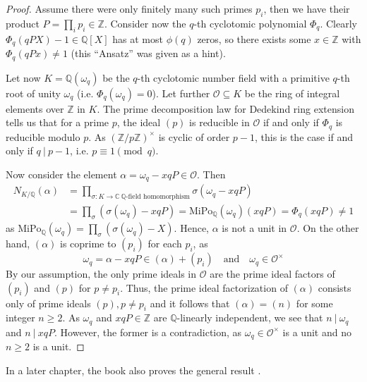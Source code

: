 \documentclass{scrartcl}
\newcommand{\Z}{\mathbb{Z}}
\newcommand{\Q}{\mathbb{Q}}
\newcommand{\C}{\mathbb{C}}
\newcommand{\divides}{\ | \ }
\newcommand{\units}{\times}
\theoremstyle{definition}
\begin{document}
\begin{proof}
    Assume there were only finitely many such primes $p_i$, then we have their product $P = \prod_i p_i \in \Z$.
    Consider now the $q$-th cyclotomic polynomial $\Phi_q$.
    Clearly $\Phi_q(qPX) - 1 \in \Q[X]$ has at most $\phi(q)$ zeros, so there exists some $x \in \Z$ with $\Phi_q(qPx) \neq 1$ (this ``Ansatz'' was given as a hint).

    Let now $K = \Q(\omega_q)$ be the $q$-th cyclotomic number field with a primitive $q$-th root of unity $\omega_q$ (i.e. $\Phi_q(\omega_q) = 0$).
    Let further $\mathcal{O} \subseteq K$ be the ring of integral elements over $\Z$ in $K$.
    The prime decomposition law for Dedekind ring extension \cite[Chapter I, Prop 8.3]{neukirch} tells us that for a prime $p$, the ideal $(p)$ is reducible in $\mathcal{O}$ if and only if $\Phi_q$ is reducible modulo $p$.
    As $(\Z/p\Z)^\units$ is cyclic of order $p - 1$, this is the case if and only if $q \divides p - 1$, i.e. $p \equiv 1 \pmod q$.

    Now consider the element $\alpha = \omega_q - xqP \in \mathcal{O}$. Then
    \begin{align*}
        N_{K/\Q}(\alpha) &= \prod_{\sigma: K \to \C \ \text{$\Q$-field homomorphism}} \sigma(\omega_q - xqP) \\
        &= \prod_{\sigma} (\sigma(\omega_q) - xqP) = \mathrm{MiPo}_\Q(\omega_q)(xqP) = \Phi_q(xqP) \neq 1
    \end{align*}
    as $\mathrm{MiPo}_\Q(\omega_q) = \prod_\sigma (\sigma(\omega_q) - X)$.
    Hence, $\alpha$ is not a unit in $\mathcal{O}$.
    On the other hand, $(\alpha)$ is coprime to $(p_i)$ for each $p_i$, as 
    \begin{equation*}
        \omega_q = \alpha - xqP \in (\alpha) + (p_i) \quad \text{and} \quad \omega_q \in \mathcal{O}^\units
    \end{equation*}
    By our assumption, the only prime ideals in $\mathcal{O}$ are the prime ideal factors of $(p_i)$ and $(p)$ for $p \neq p_i$.
    Thus, the prime ideal factorization of $(\alpha)$ consists only of prime ideals $(p), p \neq p_i$ and it follows that $(\alpha) = (n)$ for some integer $n \geq 2$.
    As $\omega_q$ and $xqP \in \Z$ are $\Q$-linearly independent, we see that $n \divides \omega_q$ and $n \divides xqP$.
    However, the former is a contradiction, as $\omega_q \in \mathcal{O}^\units$ is a unit and no $n \geq 2$ is a unit.
\end{proof}
In a later chapter, the book also proves the general result \cite[Chapter VII, Theorem 5.14]{neukirch}.
\end{document}
